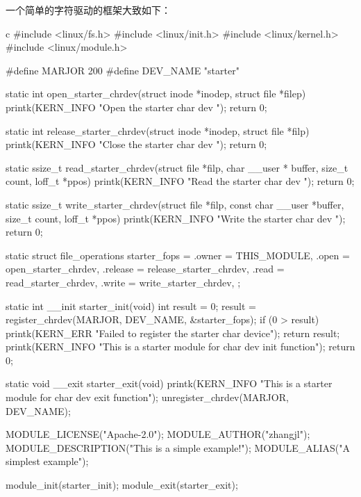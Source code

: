 一个简单的字符驱动的框架大致如下：
\begin{code-block}{c}
#include <linux/fs.h>
#include <linux/init.h>
#include <linux/kernel.h>
#include <linux/module.h>

#define MARJOR 200
#define DEV_NAME "starter"

static int open_starter_chrdev(struct inode *inodep, struct file *filep)
{
        printk(KERN_INFO "Open the starter char dev \n");
        return 0;
}

static int release_starter_chrdev(struct inode *inodep, struct file *filp)
{
        printk(KERN_INFO "Close the starter char dev \n");
        return 0;
}

static ssize_t read_starter_chrdev(struct file *filp,
                char __user * buffer, size_t count, loff_t *ppos)
{
        printk(KERN_INFO "Read the starter char dev \n");
        return 0;
}

static ssize_t write_starter_chrdev(struct file *filp,
                const char __user *buffer, size_t count, loff_t *ppos)
{
        printk(KERN_INFO "Write the starter char dev \n");
        return 0;
}

static struct file_operations starter_fops = {
        .owner = THIS_MODULE,
        .open = open_starter_chrdev,
        .release = release_starter_chrdev,
        .read = read_starter_chrdev,
        .write = write_starter_chrdev,
};

static int __init starter_init(void)
{
        int result = 0;
        result = register_chrdev(MARJOR, DEV_NAME, &starter_fops);
        if (0 > result) {
                printk(KERN_ERR
                        "Failed to register the starter char device\n");
                return result;
        }
        printk(KERN_INFO
                "This is a starter module for char dev init function\n");
        return 0;
}

static void __exit starter_exit(void)
{
        printk(KERN_INFO
                "This is a starter module for char dev exit function\n");
        unregister_chrdev(MARJOR, DEV_NAME);
}

MODULE_LICENSE("Apache-2.0");
MODULE_AUTHOR("zhangjl");
MODULE_DESCRIPTION("This is a simple example!\n");
MODULE_ALIAS("A simplest example");

module_init(starter_init);
module_exit(starter_exit);
\end{code-block}

